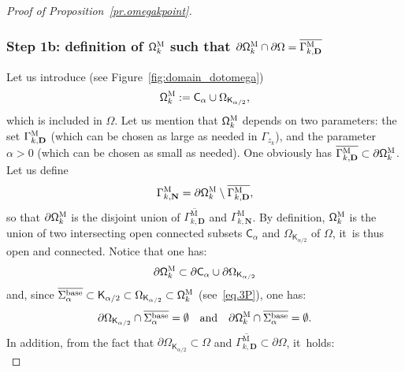 \documentclass[JEP,XML,SOM,Unicode,NoEqCountersInSection,NoFloatCountersInSection,published]{cedram}
\newcommand{\quand}{\quad\text{and}\quad}
\newcommand{\mbf}[1]{\mathbf{#1}}
\let\pa\partial
\theoremstyle{plain}
\theoremstyle{definition}
\begin{document}
\begin{proof}[Proof of Proposition~\ref{pr.omegakpoint}]
\subsubsection*{Step 1b: definition of $\mathsf \Omega_k^{\textsc{M}}$ such that $ \pa \mathsf \Omega_k^{\textsc{M}} \cap \partial \Omega =\overline{\Gamma_{k,\mbf D}^{\text{M}}}$}
Let us introduce (see Figure~\ref{fig:domain_dotomega})
\begin{equation}\label{eq.DEFDOTOMEGA}
\mathsf \Omega_k^{\textsc{M}}:= \mathsf C_\alpha \cup\Omega_{\mathsf K_{\alpha/2}},
\end{equation}
which is included in $\Omega$. Let us mention that $ \mathsf
\Omega_k^{\textsc{M}}$ depends on two parameters: the set
$\Gamma_{k,\mbf D}^{\textsc{M}}$ (which can be chosen as large as
needed in $\Gamma_{z_k}$), and the parameter $\alpha>0$ (which can
be chosen as small as needed).
One obviously has $\overline{\Gamma_{k,\mbf D}^{\text{M}}}\subset \pa \mathsf \Omega_k^{\textsc{M}}$.
Let us define
\begin{equation}\label{eq.DEFDOTOMEGA2}
\Gamma_{k,\mbf N}^{\text{M}}= \pa \mathsf \Omega_k^{\textsc{M}}\setminus \overline{\Gamma_{k,\mbf D}^{\text{M}}},
\end{equation}
so that $ \pa \mathsf \Omega_k^{\textsc{M}}$ is the disjoint union of $\overline{\Gamma_{k,\mbf D}^{\text{M}}}$ and $ \Gamma_{k,\mbf N}^{\text{M}}$.
By definition, $\mathsf \Omega_k^{\textsc{M}} $ is the union of two intersecting open connected subsets $\mathsf C_\alpha$ and $\Omega_{\mathsf K_{\alpha/2}}$ of $\Omega$, it~is thus open and connected.
Notice that one has:
\begin{equation}\label{eq.unionboundary1}
\pa \mathsf \Omega_k^{\textsc{M}}\subset \pa \mathsf C_\alpha \cup \partial \Omega_{\mathsf K_{\alpha/2}}
\end{equation}
and, since $\overline{ \Sigma_\alpha^{\textup{base}}}\subset \mathsf K_{\alpha/2} \subset \Omega_{\mathsf K_{\alpha/2}} \subset \mathsf \Omega_{k}^{\textsc{M}}$ (see~\eqref{eq.3P}), one has:
\begin{equation}\label{eq.unionboundary2}
\partial \Omega_{\mathsf K_{\alpha/2}}\cap \overline{ \Sigma_\alpha^{\textup{base}}}=\emptyset \quand \pa \mathsf \Omega_k^{\textsc{M}}\cap \overline{ \Sigma_\alpha^{\textup{base}}}=\emptyset.
\end{equation}
In addition, from the fact that $\partial \Omega_{\mathsf K_{\alpha/2}} \subset \Omega$ and $\overline{\Gamma_{k,\mbf D}^{\text{M}}}\subset \partial \Omega$, it~holds:
\begin{equation}\label{eq.unionboundary3}

\end{equation}
\end{proof}
\end{document}
